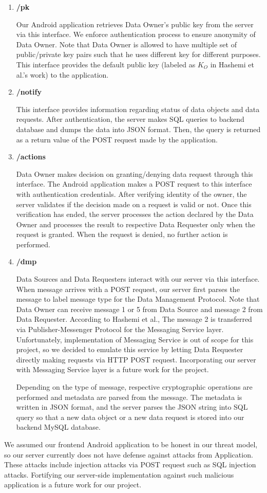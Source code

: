 \begin{enumerate}
    \item \textbf{/pk}

    Our Android application retrieves Data Owner's public key from the server via this interface. We enforce authentication process to ensure anonymity of Data Owner. Note that Data Owner is allowed to have multiple set of public/private key pairs such that he uses different key for different purposes. This interface provides the default public key (labeled as $K_O$ in Hashemi et al.'s work) to the application.

    \item \textbf{/notify}

    This interface provides information regarding status of data objects and data requests. After authentication, the server makes SQL queries to backend database and dumps the data into JSON format. Then, the query is returned as a return value of the POST request made by the application.

    \item \textbf{/actions}

    Data Owner makes decision on granting/denying data request through this interface. The Android application makes a POST request to this interface with authentication credentials. After verifying identity of the owner, the server validates if the decision made on a request is valid or not. Once this verification has ended, the server processes the action declared by the Data Owner and processes the result to respective Data Requester only when the request is granted. When the request is denied, no further action is performed.

    \item \textbf{/dmp}

    Data Sources and Data Requesters interact with our server via this interface. When message arrives with a POST request, our server first parses the message to label message type for the Data Management Protocol. Note that Data Owner can receive message 1 or 5 from Data Source and message 2 from Data Requester. According to Hashemi et al., The message 2 is transferred via Publisher-Messenger Protocol for the Messaging Service layer. Unfortunately, implementation of Messaging Service is out of scope for this project, so we decided to emulate this service by letting Data Requester directly making requests via HTTP POST request. Incorporating our server with Messaging Service layer is a future work for the project.

    Depending on the type of message, respective cryptographic operations are performed and metadata are parsed from the message. The metadata is written in JSON format, and the server parses the JSON string into SQL query so that a new data object or a new data request is stored into our backend MySQL database.
\end{enumerate}

We assumed our frontend Android application to be honest in our threat model, so our server currently does not have defense against attacks from Application. These attacks include injection attacks via POST request such as SQL injection attacks. Fortifying our server-side implementation against such malicious application is a future work for our project.